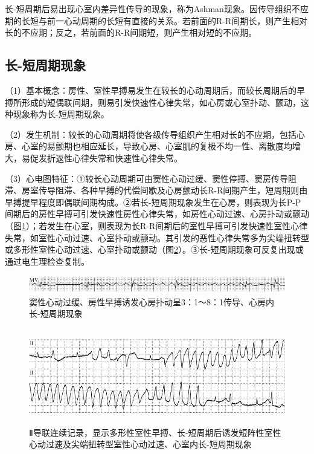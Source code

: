 长-短周期后易出现心室内差异性传导的现象，称为Ashman现象。因传导组织不应期的长短与前一心动周期的长短有直接的关系。若前面的R-R间期长，则产生相对长的不应期；反之，若前面的R-R间期短，则产生相对短的不应期。

\protect\hypertarget{text00047.htmlux5cux23subid535}{}{}

\subsection{长-短周期现象}

（1）基本概念：房性、室性早搏易发生在较长的心动周期后，而较长周期后的早搏所形成的短偶联间期，则易引发快速性心律失常，如心房或心室扑动、颤动，这种现象称为长-短周期现象。

（2）发生机制：较长的心动周期将使各级传导组织产生相对长的不应期，包括心房、心室的易颤期也相应延长，导致心房、心室肌的复极不均一性、离散度均增大，易促发折返性心律失常和快速性心律失常。

（3）心电图特征：①较长心动周期可由窦性心动过缓、窦性停搏、窦房传导阻滞、房室传导阻滞、各种早搏的代偿间歇及心房颤动长R-R间期产生，短周期则由早搏提早程度即偶联间期构成。②若长-短周期现象发生在心房，则表现为长P-P间期后的房性早搏可引发快速性房性心律失常，如房性心动过速、心房扑动或颤动（图\ref{fig40-2}）；若发生在心室，则表现为长R-R间期后的室性早搏可引发快速性室性心律失常，如室性心动过速、心室扑动或颤动。其引发的恶性心律失常多为尖端扭转型或多形性室性心动过速、心室扑动或颤动（图\ref{fig40-3}）。③长-短周期现象可反复出现或通过电生理检查复制。

\begin{figure}[!htbp]
 \centering
 \includegraphics[width=5.58333in,height=0.30208in]{./images/Image00663.jpg}
 \captionsetup{justification=centering}
 \caption{窦性心动过缓、房性早搏诱发心房扑动呈3：1～8：1传导、心房内长-短周期现象}
 \label{fig40-2}
  \end{figure} 

\begin{figure}[!htbp]
 \centering
 \includegraphics[width=5.60417in,height=1.64583in]{./images/Image00664.jpg}
 \captionsetup{justification=centering}
 \caption{Ⅱ导联连续记录，显示多形性室性早搏、长-短周期后诱发短阵性室性心动过速及尖端扭转型室性心动过速、心室内长-短周期现象}
 \label{fig40-3}
  \end{figure} 

